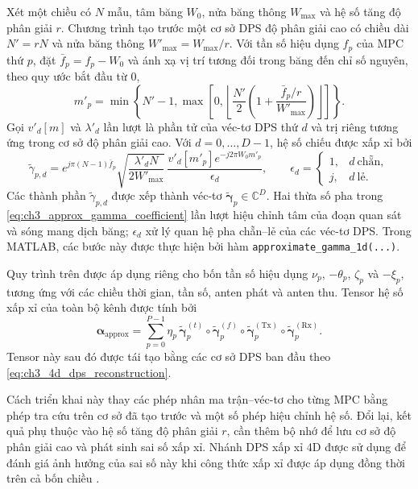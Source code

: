 Xét một chiều có \(N\) mẫu, tâm băng \(W_0\), nửa băng thông \(W_{\max}\) và hệ số tăng độ phân giải \(r\). Chương trình tạo trước một cơ sở DPS độ phân giải cao có chiều dài \(N'=rN\) và nửa băng thông \(W'_{\max}=W_{\max}/r\). Với tần số hiệu dụng \(f_p\) của MPC thứ \(p\), đặt \(\bar f_p=f_p-W_0\) và ánh xạ vị trí tương đối trong băng đến chỉ số nguyên, theo quy ước bắt đầu từ 0,
\begin{equation}
m'_p=
\min\!\left\{N'-1,
\max\!\left[0,
\left\lfloor
\frac{N'}{2}\left(1+\frac{\bar f_p/r}{W'_{\max}}\right)
\right\rfloor
\right]\right\}.
\label{eq:ch3_approx_gamma_index}
\end{equation}
Gọi \(v'_{d}[m]\) và \(\lambda'_d\) lần lượt là phần tử của véc-tơ DPS thứ \(d\) và trị riêng tương ứng trong cơ sở độ phân giải cao. Với \(d=0,\ldots,D-1\), hệ số chiếu được xấp xỉ bởi
\begin{equation}
\widetilde{\gamma}_{p,d}
=
e^{j\pi(N-1)\bar f_p}
\sqrt{\frac{\lambda'_d N}{2W'_{\max}}}\,
\frac{v'_d[m'_p]e^{-j2\pi W_0m'_p}}{\epsilon_d},
\qquad
\epsilon_d=
\begin{cases}
1, & d\ \text{chẵn},\\
j, & d\ \text{lẻ}.
\end{cases}
\label{eq:ch3_approx_gamma_coefficient}
\end{equation}
Các thành phần \(\widetilde{\gamma}_{p,d}\) được xếp thành véc-tơ \(\widetilde{\boldsymbol{\gamma}}_p\in\mathbb{C}^{D}\). Hai thừa số pha trong \eqref{eq:ch3_approx_gamma_coefficient} lần lượt hiệu chỉnh tâm của đoạn quan sát và sóng mang dịch băng; \(\epsilon_d\) xử lý quan hệ pha chẵn--lẻ của các véc-tơ DPS. Trong MATLAB, các bước này được thực hiện bởi hàm \texttt{approximate\_gamma\_1d(...)}.

Quy trình trên được áp dụng riêng cho bốn tần số hiệu dụng \(\nu_p\), \(-\theta_p\), \(\zeta_p\) và \(-\xi_p\), tương ứng với các chiều thời gian, tần số, anten phát và anten thu. Tensor hệ số xấp xỉ của toàn bộ kênh được tính bởi
\begin{equation}
\boldsymbol{\alpha}_{\mathrm{approx}}
=
\sum_{p=0}^{P-1}\eta_p\,
\widetilde{\boldsymbol{\gamma}}^{(t)}_p
\circ
\widetilde{\boldsymbol{\gamma}}^{(f)}_p
\circ
\widetilde{\boldsymbol{\gamma}}^{(\mathrm{Tx})}_p
\circ
\widetilde{\boldsymbol{\gamma}}^{(\mathrm{Rx})}_p.
\label{eq:ch3_approx_alpha}
\end{equation}
Tensor này sau đó được tái tạo bằng các cơ sở DPS ban đầu theo \eqref{eq:ch3_4d_dps_reconstruction}.

Cách triển khai này thay các phép nhân ma trận--véc-tơ cho từng MPC bằng phép tra cứu trên cơ sở đã tạo trước và một số phép hiệu chỉnh hệ số. Đổi lại, kết quả phụ thuộc vào hệ số tăng độ phân giải \(r\), cần thêm bộ nhớ để lưu cơ sở độ phân giải cao và phát sinh sai số xấp xỉ. Nhánh DPS xấp xỉ 4D được sử dụng để đánh giá ảnh hưởng của sai số này khi công thức xấp xỉ được áp dụng đồng thời trên cả bốn chiều \cite{Kaltenberger2007}.

